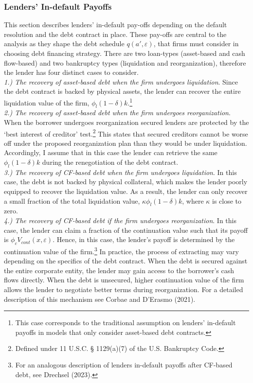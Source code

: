 \documentclass[12pt]{article}
\begin{document}
\subsubsection{Lenders' In-default Payoffs}   \label{sec:Default Payoffs}
This section describes lenders' in-default pay-offs depending on the default resolution and the debt contract in place. These pay-offs are central to the analysis as they shape the debt schedule $q(a', \varepsilon)$, that firms must consider in choosing debt financing strategy. There are two loan-types (asset-based and cash flow-based) and two bankruptcy types (liquidation and reorganization), therefore the lender has four distinct cases to consider. \vspace{3mm} \\
\textit{ 1.) The recovery of asset-based debt when the firm undergoes liquidation}. Since the debt contract is backed by physical assets, the lender can recover the entire liquidation value of the firm, $\phi_l(1-\delta)k$.\footnote{This case corresponds to the traditional assumption on lenders' in-default payoffs in models that only consider asset-based debt contracts.} \vspace{3mm} \\
\textit{ 2.) The recovery of asset-based debt when the firm undergoes reorganization}. When the borrower undergoes reorganization secured lenders are protected by the ‘best interest of creditor’ test.\footnote{Defined under 11 U.S.C. § 1129(a)(7) of the U.S. Bankruptcy Code.} This states that secured creditors cannot be worse off under the proposed reorganization plan than they would be under liquidation. Accordingly, I assume that in this case the lender can retrieve the same $\phi_l(1-\delta)k$ during the renegotiation of the debt contract. \vspace{3mm} \\
\textit{ 3.) The recovery of CF-based debt when the firm undergoes liquidation}. In this case, the debt is not backed by physical collateral, which makes the lender poorly equipped to recover the liquidation value. As a result, the lender can only recover a small fraction of the total liquidation value, $\kappa \phi_l(1-\delta)k$, where $\kappa$ is close to zero. \vspace{3mm} \\
\textit{ 4.) The recovery of CF-based debt if the firm undergoes reorganization}. In this case, the lender can claim a fraction of the continuation value such that its payoff is $\phi_c V_{cont}(x,\varepsilon)$. Hence, in this case, the lender's payoff is determined by the continuation value of the firm.\footnote{For an analogous description of lenders in-default payoffs after CF-based debt, see Drechsel (2023).} In practice, the process of extracting may vary depending on the specifics of the debt contract. When the debt is secured against the entire corporate entity, the lender may gain access to the borrower's cash flows directly. When the debt is unsecured, higher continuation value of the firm allows the lender to negotiate better terms during reorganization. For a detailed description of this mechanism see Corbae and D'Erasmo (2021). \vspace{3mm} \\
\end{document}
